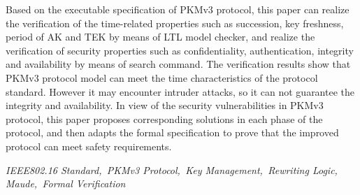 Based on the executable specification of PKMv3 protocol, this paper can realize the verification of the time-related properties such as succession, key freshness, period of AK and TEK by means of LTL model checker, and realize the verification of security properties such as confidentiality, authentication, integrity and availability by means of search command. The verification results show that PKMv3 protocol model can meet the time characteristics of the protocol standard. However it may encounter intruder attacks, so it can not guarantee the integrity and availability. In view of the security vulnerabilities in PKMv3 protocol, this paper proposes corresponding solutions in each phase of the protocol, and then adapts the formal specification to prove that the improved protocol can meet safety requirements.

\hspace{-0.5cm}

{} \textit{IEEE802.16 Standard,\, PKMv3 Protocol,\, Key Management,\, Rewriting Logic,\, Maude,\, Formal Verification
}
































